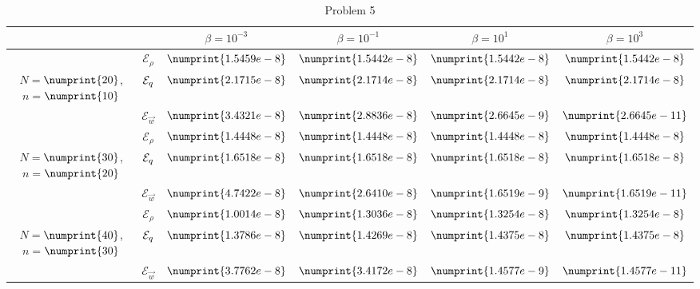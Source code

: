 \begin{table}
\begin{tabular}{ ||c|| c | c | c | c | c ||}
\hline
& & $\beta = 10^{-3}$ & $\beta = 10^{-1}$ & $\beta = 10^{1}$ & $\beta = 10^{3}$  \\
\hline
 & $\mathcal{E}_\rho$ & $\numprint{1.5459e-8}$ & $\numprint{1.5442e-8}$ & $\numprint{1.5442e-8}$ & $\numprint{1.5442e-8}$ \\
 $N = $$\numprint{20}$, $n = $$\numprint{10}$  & $\mathcal{E}_q$ & $\numprint{2.1715e-8}$ & $\numprint{2.1714e-8}$ & $\numprint{2.1714e-8}$ & $\numprint{2.1714e-8}$ \\
& $\mathcal{E}_{\vec{w}}$ & $\numprint{3.4321e-8}$ & $\numprint{2.8836e-8}$ & $\numprint{2.6645e-9}$ & $\numprint{2.6645e-11}$ \\
\hline
 & $\mathcal{E}_\rho$ & $\numprint{1.4448e-8}$ & $\numprint{1.4448e-8}$ & $\numprint{1.4448e-8}$ & $\numprint{1.4448e-8}$ \\
 $N = $$\numprint{30}$, $n = $$\numprint{20}$  & $\mathcal{E}_q$ & $\numprint{1.6518e-8}$ & $\numprint{1.6518e-8}$ & $\numprint{1.6518e-8}$ & $\numprint{1.6518e-8}$ \\
& $\mathcal{E}_{\vec{w}}$ & $\numprint{4.7422e-8}$ & $\numprint{2.6410e-8}$ & $\numprint{1.6519e-9}$ & $\numprint{1.6519e-11}$ \\
\hline
 & $\mathcal{E}_\rho$ & $\numprint{1.0014e-8}$ & $\numprint{1.3036e-8}$ & $\numprint{1.3254e-8}$ & $\numprint{1.3254e-8}$ \\
 $N = $$\numprint{40}$, $n = $$\numprint{30}$  & $\mathcal{E}_q$ & $\numprint{1.3786e-8}$ & $\numprint{1.4269e-8}$ & $\numprint{1.4375e-8}$ & $\numprint{1.4375e-8}$ \\
& $\mathcal{E}_{\vec{w}}$ & $\numprint{3.7762e-8}$ & $\numprint{3.4172e-8}$ & $\numprint{1.4577e-9}$ & $\numprint{1.4577e-11}$ \\
\hline
\end{tabular}
\caption{Problem 5}
\label{TabA1:Prob5}
\end{table}